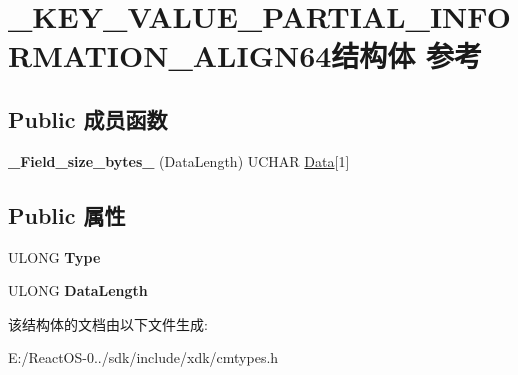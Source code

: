 \hypertarget{struct___k_e_y___v_a_l_u_e___p_a_r_t_i_a_l___i_n_f_o_r_m_a_t_i_o_n___a_l_i_g_n64}{}\section{\+\_\+\+K\+E\+Y\+\_\+\+V\+A\+L\+U\+E\+\_\+\+P\+A\+R\+T\+I\+A\+L\+\_\+\+I\+N\+F\+O\+R\+M\+A\+T\+I\+O\+N\+\_\+\+A\+L\+I\+G\+N64结构体 参考}
\label{struct___k_e_y___v_a_l_u_e___p_a_r_t_i_a_l___i_n_f_o_r_m_a_t_i_o_n___a_l_i_g_n64}
\subsection*{Public 成员函数}
\begin{DoxyCompactItemize}
\item 
\mbox{\label{struct___k_e_y___v_a_l_u_e___p_a_r_t_i_a_l___i_n_f_o_r_m_a_t_i_o_n___a_l_i_g_n64_ad18d16ff2a0ab3f9b9614c8f89f59257}} 
{\bfseries \+\_\+\+Field\+\_\+size\+\_\+bytes\+\_\+} (Data\+Length) U\+C\+H\+AR \hyperlink{struct_data}{Data}\mbox{[}1\mbox{]}
\end{DoxyCompactItemize}
\subsection*{Public 属性}
\begin{DoxyCompactItemize}
\item 
\mbox{\label{struct___k_e_y___v_a_l_u_e___p_a_r_t_i_a_l___i_n_f_o_r_m_a_t_i_o_n___a_l_i_g_n64_a46339b87a34b1015d3bcf54ad3108d62}} 
U\+L\+O\+NG {\bfseries Type}
\item 
\mbox{\label{struct___k_e_y___v_a_l_u_e___p_a_r_t_i_a_l___i_n_f_o_r_m_a_t_i_o_n___a_l_i_g_n64_abf9b15e107d5d4dcee6e74ff2b62e808}} 
U\+L\+O\+NG {\bfseries Data\+Length}
\end{DoxyCompactItemize}


该结构体的文档由以下文件生成\+:\begin{DoxyCompactItemize}
\item 
E\+:/\+React\+O\+S-\/0../sdk/include/xdk/cmtypes.\+h\end{DoxyCompactItemize}
